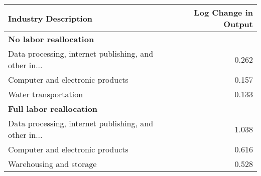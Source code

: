 \begin{tabular}{lr}
\toprule
Industry Description & Log Change in Output \\
\midrule
\midrule
\multicolumn{2}{l}{\textbf{No labor reallocation}} \\
\midrule
Data processing, internet publishing, and other in... & 0.262 \\
Computer and electronic products & 0.157 \\
Water transportation & 0.133 \\
\midrule
\multicolumn{2}{l}{\textbf{Full labor reallocation}} \\
\midrule
Data processing, internet publishing, and other in... & 1.038 \\
Computer and electronic products & 0.616 \\
Warehousing and storage & 0.528 \\
\bottomrule
\end{tabular}
